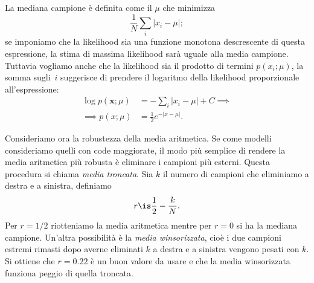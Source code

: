 \begin{solution}
	La mediana campione è definita come il $\mu$ che minimizza
	\begin{equation*}
		\frac 1N \sum_i |x_i - \mu|;
	\end{equation*}
	se imponiamo che la likelihood sia una funzione monotona descrescente di questa espressione,
	la stima di massima likelihood sarà uguale alla media campione.
	Tuttavia vogliamo anche che la likelihood sia il prodotto di termini $p(x_i;\mu)$,
	la somma sugli~$i$ suggerisce di prendere il logaritmo della likelihood proporzionale all'espressione:
	\begin{align*}
		\log p(\mathbf x;\mu)
		&= -\sum_i |x_i - \mu| + C \implies \\
		\implies p(x;\mu)
		&= \frac12 e^{-|x-\mu|}.
	\end{align*}
\end{solution}

Consideriamo ora la robustezza della media aritmetica.
Se come modelli consideriamo quelli con code maggiorate,
il modo più semplice di rendere la media aritmetica più robusta è eliminare i campioni più esterni.
Questa procedura si chiama \emph{media troncata}.
Sia $k$ il numero di campioni che eliminiamo a destra e a sinistra,
definiamo
\begin{equation*}
	r \is \frac12 - \frac kN.
\end{equation*}
Per $r=1/2$ riotteniamo la media aritmetica mentre per $r=0$ si ha la mediana campione.
Un'altra possibilità è la \emph{media winsorizzata},
cioè i due campioni estremi rimasti dopo averne eliminati $k$ a destra e a sinistra vengono pesati con $k$.
Si ottiene che $r=0.22$ è un buon valore da usare e che la media winsorizzata funziona peggio di quella troncata.
%

